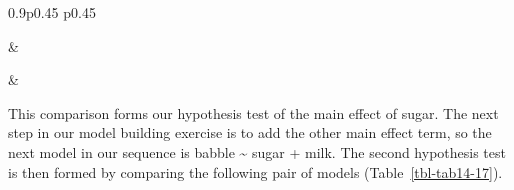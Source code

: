 \documentclass[
  a4paper,
]{book}
\begin{document}
\begin{table}[ht]
\caption{\label{tbl-tab14-16}Null and alternative hypotheses with the outcome variable `babble' }\tabularnewline

\begin{centerbox}
\begin{threeparttable}
\setlength{\tabcolsep}{0pt}
\begin{tabularx}{0.9\textwidth}{p{} p{}}



 &
 \tabularnewline[-0.5pt]



 &
 \tabularnewline[-0.5pt]


\end{tabularx} 

\end{threeparttable}\par\end{centerbox}

\end{table}
 

This comparison forms our hypothesis test of the main effect of sugar.
The next step in our model building exercise is to add the other main
effect term, so the next model in our sequence is babble
\textasciitilde{} sugar + milk. The second hypothesis test is then
formed by comparing the following pair of models
(Table~\ref{tbl-tab14-17}).
\end{document}
